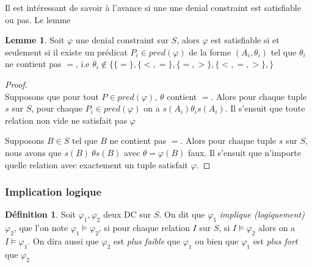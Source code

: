 \documentclass[letterpaper, 12pt]{report}
\theoremstyle{definition}
\newtheorem{mydef}{Définition}
\newtheorem{mylemma}{Lemme}
\newcommand{\alinea}{
\hspace*{0.5cm}}
\begin{document}
Il est intéressant de savoir à l'avance si une une denial constraint est satisfiable ou pas. Le lemme 

\begin{mylemma}\label{satisLemma}
	Soit $\varphi$ une denial constraint sur $S$, alors $\varphi$ est satisfiable si et seulement si il existe un prédicat $P_i \in pred (\varphi)$ de la forme $(A_i,\theta_i)$ tel que $\theta_i$ ne contient pas $=$, i.e $\theta_i \not\in \{ \{=\},\{<,=\},\{=,>\},\{<,=,>\},\} $ 
\end{mylemma}
\begin{proof}~\\
\alinea \framebox{$\implies$} Supposons que pour tout $P \in pred(\varphi)$, $\theta$ contient $=$. Alors pour chaque tuple $s$ sur $S$, pour chaque $P_i \in pred(\varphi)$ on a $s(A_i) \theta_i s(A_i)$. Il s'ensuit que toute relation non vide ne satisfait pas $\varphi$

\framebox{$\impliedby$} Supposons $B \in S$ tel que $B$ ne contient pas $=$. Alors pour chaque tuple $s$ sur $S$, nous avons que $s(B)\ \theta s(B)$ avec $\theta=\varphi(B)$ faux. Il s'ensuit que n'importe quelle relation avec exactement un tuple satisfait $\varphi$.

\end{proof}


\subsubsection{Implication logique}

\begin{mydef}
Soit $\varphi_1,\varphi_2$ deux DC sur $S$. On dit que $\varphi_1$ \emph{implique (logiquement)} $\varphi_2$, que l'on note $\varphi_1 \models\varphi_2$, si pour chaque relation $I$ sur $S$, si $I \models \varphi_2$ alors on a $I \models \varphi_1$. On dira aussi que $\varphi_2$ est \emph{plus faible} que $\varphi_1$ ou bien que $\varphi_1$ est \emph{plus fort} que $\varphi_2$
\end{mydef}
\end{document}
